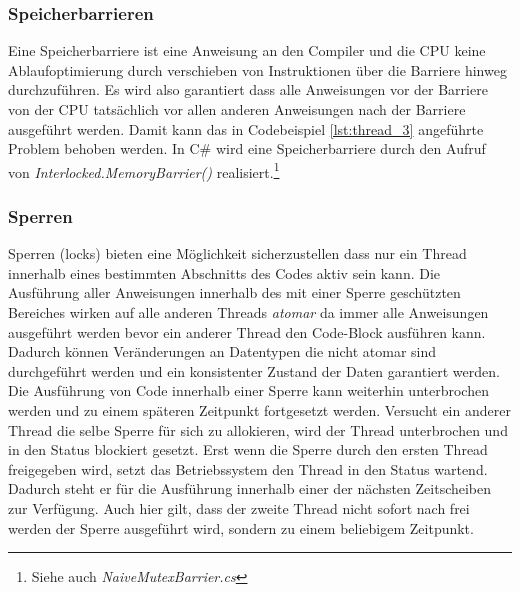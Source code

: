 \subsubsection{Speicherbarrieren}
Eine Speicherbarriere ist eine Anweisung an den Compiler und die CPU keine Ablaufoptimierung durch verschieben von Instruktionen über die Barriere hinweg durchzuführen. Es wird also garantiert dass alle Anweisungen vor der Barriere von der CPU tatsächlich vor allen anderen Anweisungen nach der Barriere ausgeführt werden.\parencite[S. 195]{tanenbaum2016} Damit kann das in Codebeispiel \ref{lst:thread_3} angeführte Problem behoben werden. In C\# wird eine Speicherbarriere durch den Aufruf von \textit{Interlocked.MemoryBarrier()} realisiert.\parencite{ms_interlocked_barrier}\footnote{Siehe auch \textit{NaiveMutexBarrier.cs}}

\subsubsection{Sperren}\label{sss:Sperren}	
Sperren (locks) bieten eine Möglichkeit sicherzustellen dass nur ein Thread innerhalb eines bestimmten Abschnitts des Codes aktiv sein kann. Die Ausführung aller Anweisungen innerhalb des mit einer Sperre geschützten Bereiches wirken auf alle anderen Threads \textit{atomar} da immer alle Anweisungen ausgeführt werden bevor ein anderer Thread den Code-Block ausführen kann. Dadurch können Veränderungen an Datentypen die nicht atomar sind durchgeführt werden und ein konsistenter Zustand der Daten garantiert werden. 
\\Die Ausführung von Code innerhalb einer Sperre kann weiterhin unterbrochen werden und zu einem späteren Zeitpunkt fortgesetzt werden. Versucht ein anderer Thread die selbe Sperre für sich zu allokieren, wird der Thread unterbrochen und in den Status blockiert gesetzt. Erst wenn die Sperre durch den ersten Thread freigegeben wird, setzt das Betriebssystem den Thread in den Status wartend. Dadurch steht er für die Ausführung innerhalb einer der nächsten Zeitscheiben zur Verfügung. Auch hier gilt, dass der zweite Thread nicht sofort nach frei werden der Sperre ausgeführt wird, sondern zu einem beliebigem Zeitpunkt.

